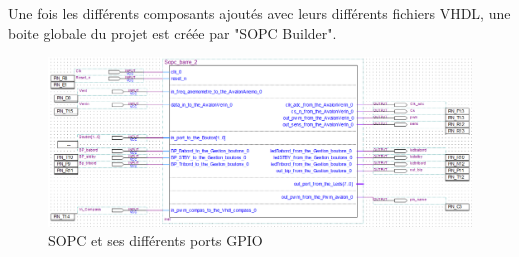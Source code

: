   Une fois les différents composants ajoutés avec leurs différents fichiers VHDL, une boite globale du projet est créée par "SOPC Builder".

  \begin{figure}[h]
    \begin{center}
      \includegraphics[width=\textwidth]{images/sopc_bloc.png}
      \caption{SOPC et ses différents ports GPIO}
    \end{center}
  \end{figure}
